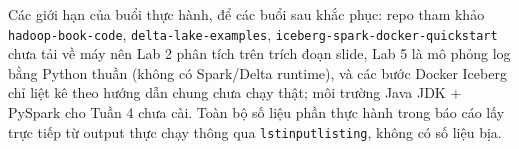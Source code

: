 \documentclass[12pt,a4paper,oneside]{article}
\begin{document}
Các giới hạn của buổi thực hành, để các buổi sau khắc phục: repo tham khảo \texttt{hadoop-book-code}, \texttt{delta-lake-examples}, \texttt{iceberg-spark-docker-quickstart} chưa tải về máy nên Lab 2 phân tích trên trích đoạn slide, Lab 5 là mô phỏng log bằng Python thuần (không có Spark/Delta runtime), và các bước Docker Iceberg chỉ liệt kê theo hướng dẫn chung chưa chạy thật; môi trường Java JDK + PySpark cho Tuần 4 chưa cài. Toàn bộ số liệu phần thực hành trong báo cáo lấy trực tiếp từ output thực chạy thông qua \texttt{lstinputlisting}, không có số liệu bịa.
\end{document}
